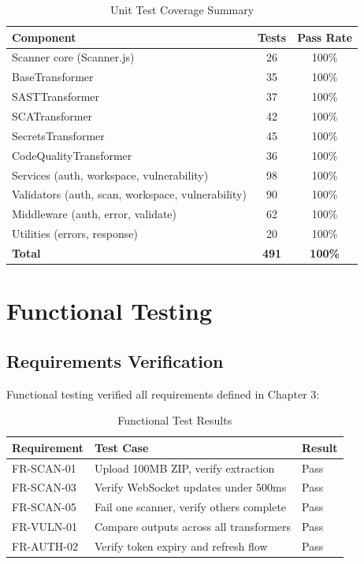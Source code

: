 \documentclass[12pt,a4paper]{report}
\begin{document}
\begin{table}[H]
\centering
\caption{Unit Test Coverage Summary}
\label{tab:unit_tests}
\begin{tabular}{|l|c|c|}
\hline
\textbf{Component} & \textbf{Tests} & \textbf{Pass Rate} \\
\hline
Scanner core (Scanner.js) & 26 & 100\% \\
\hline
BaseTransformer & 35 & 100\% \\
\hline
SASTTransformer & 37 & 100\% \\
\hline
SCATransformer & 42 & 100\% \\
\hline
SecretsTransformer & 45 & 100\% \\
\hline
CodeQualityTransformer & 36 & 100\% \\
\hline
Services (auth, workspace, vulnerability) & 98 & 100\% \\
\hline
Validators (auth, scan, workspace, vulnerability) & 90 & 100\% \\
\hline
Middleware (auth, error, validate) & 62 & 100\% \\
\hline
Utilities (errors, response) & 20 & 100\% \\
\hline
\textbf{Total} & \textbf{491} & \textbf{100\%} \\
\hline
\end{tabular}
\end{table}

\section{Functional Testing}

\subsection{Requirements Verification}

Functional testing verified all requirements defined in Chapter 3:

\begin{table}[H]
\centering
\caption{Functional Test Results}
\label{tab:functional_tests}
\begin{tabular}{|l|l|l|}
\hline
\textbf{Requirement} & \textbf{Test Case} & \textbf{Result} \\
\hline
FR-SCAN-01 & Upload 100MB ZIP, verify extraction & Pass \\
\hline
FR-SCAN-03 & Verify WebSocket updates under 500ms & Pass \\
\hline
FR-SCAN-05 & Fail one scanner, verify others complete & Pass \\
\hline
FR-VULN-01 & Compare outputs across all transformers & Pass \\
\hline
FR-AUTH-02 & Verify token expiry and refresh flow & Pass \\
\hline
\end{tabular}
\end{table}
\end{document}
